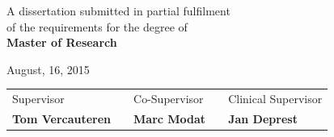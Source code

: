 \documentclass[a4paper,10pt]{book}
\theoremstyle{definition}
\begin{document}
\begin{titlepage}
\vspace{1cm}

\begin{center}
	A dissertation submitted in partial fulfilment 
	\\
	of the requirements for the degree of
	\\ 
	{\bf Master of Research}	
\end{center}

\vspace{0.2cm}
\begin{center}
	August, 16, 2015
\end{center}

\vspace{2.0cm}

\begin{center}
\begin{tabular}{l p{1.5cm} l p{1.5cm} l}
	Supervisor&   & Co-Supervisor & &  Clinical Supervisor \\
	\textbf{Tom Vercauteren} &  & \textbf{Marc Modat}& & \textbf{Jan Deprest}  \\
\end{tabular}
\end{center}

\par
\vfill\par 

\endgroup


\end{titlepage}




\pagestyle{plain}  
\tableofcontents




\newpage
\pagestyle{fancy} 


\fancyhead{} %

\fancyhead[LE]{\slshape \rightmark}

\fancyhead[RO]{\slshape \leftmark}
\fancyfoot[C]{\thepage}
\renewcommand{\headrulewidth}{0.4pt}


\end{document}
